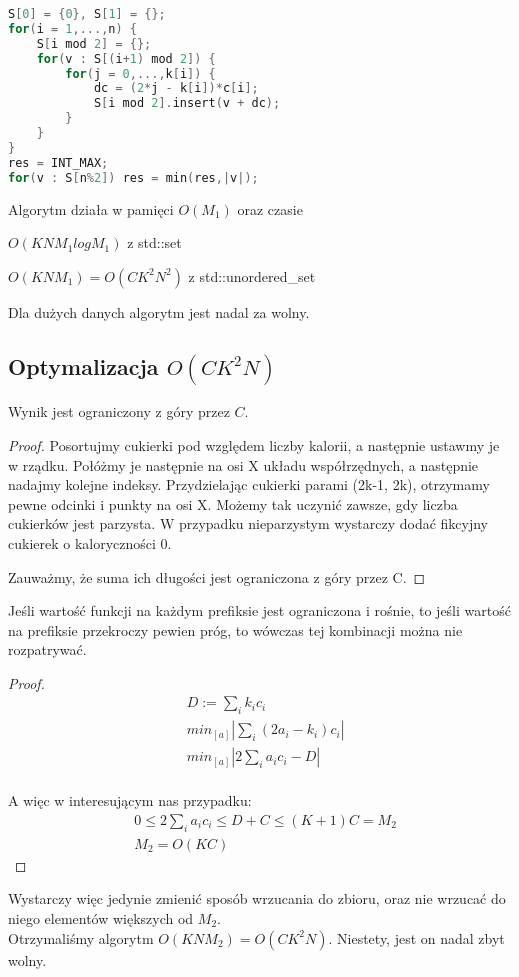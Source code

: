 \documentclass[paper=a4, fontsize=11pt]{article}
\begin{document}
\begin{lstlisting}[language=c++]
S[0] = {0}, S[1] = {};
for(i = 1,...,n) {
	S[i mod 2] = {};
	for(v : S[(i+1) mod 2]) {
		for(j = 0,...,k[i]) {
			dc = (2*j - k[i])*c[i];
			S[i mod 2].insert(v + dc);
		}
	}
}
res = INT_MAX;
for(v : S[n%2]) res = min(res,|v|);
\end{lstlisting}
Algorytm działa w pamięci $O(M_1)$ oraz czasie
\begin{description}
	\item $O(KNM_1logM_1)$ z std::set
	\item $O(KNM_1) = O(CK^2N^2)$ z std::unordered\_set 
\end{description}
Dla dużych danych algorytm jest nadal za wolny.

\subsection{Optymalizacja $O(CK^2N)$}
\begin{lemma} Wynik jest ograniczony z góry przez $C$.
\begin{proof} Posortujmy cukierki pod względem liczby kalorii, a następnie ustawmy je w rządku. Połóżmy je następnie na osi X układu współrzędnych, a następnie nadajmy kolejne indeksy. Przydzielając cukierki parami (2k-1, 2k), otrzymamy pewne odcinki i punkty na osi X. Możemy tak uczynić zawsze, gdy liczba cukierków jest parzysta. W przypadku nieparzystym wystarczy dodać fikcyjny cukierek o kaloryczności 0.

Zauważmy, że suma ich długości jest ograniczona z góry przez C.
\end{proof}
\end{lemma}
\begin{lemma} Jeśli wartość funkcji na każdym prefiksie jest ograniczona i rośnie, to jeśli wartość na prefiksie przekroczy pewien próg, to wówczas tej kombinacji można nie rozpatrywać.
\begin{proof}
\begin{align*}
&D:= \sum_i k_i c_i \\
&min_{[a]} |\sum_i (2a_i - k_i) c_i| \\
&min_{[a]} |2\sum_i a_i c_i - D| \\
\end{align*}

A więc w interesującym nas przypadku:
\begin{align*}	
& 0 \leq 2\sum_i a_ic_i \leq D + C \leq (K+1)C = M_2 \\
& M_2 = O(KC)
\end{align*}
\end{proof}
\end{lemma}
\begin{displaymath}
\end{displaymath}
Wystarczy więc jedynie zmienić sposób wrzucania do zbioru, oraz nie wrzucać do niego elementów większych od $M_2$. \\
Otrzymaliśmy algorytm $O(KNM_2) = O(CK^2N)$. Niestety, jest on nadal zbyt wolny.
\end{document}
